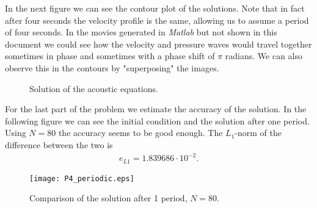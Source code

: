 In the next figure we can see the contour plot of the solutions. Note that in fact after four seconds the velocity profile is the same, allowing us to assume a period of four seconds. In the movies generated in \textsl{Matlab} but not shown in this document we could see how the velocity and pressure waves would travel together sometimes in phase and sometimes with a phase shift of $\pi$ radians. We can also observe this in the contours by "superposing" the images.

\begin{figure}[H]
\centering     %
\hspace*{\fill}
\hfill
{}
\hspace*{\fill}
\caption{Solution of the acoustic equations.}
\end{figure}

For the last part of the problem we estimate the accuracy of the solution. In the following figure we can see the initial condition and the solution after one period. Using $N=80$ the accuracy seems to be good enough. The $L_1$-norm of the difference between the two is
\begin{align*}
e_{L1}=1.839686\cdot 10^{-2}.
\end{align*}

\begin{figure}[H]
\centering     %
{\texttt{[image: P4\_periodic.eps]}}
\caption{Comparison of the solution after 1 period, $N=80$.}
\end{figure}

